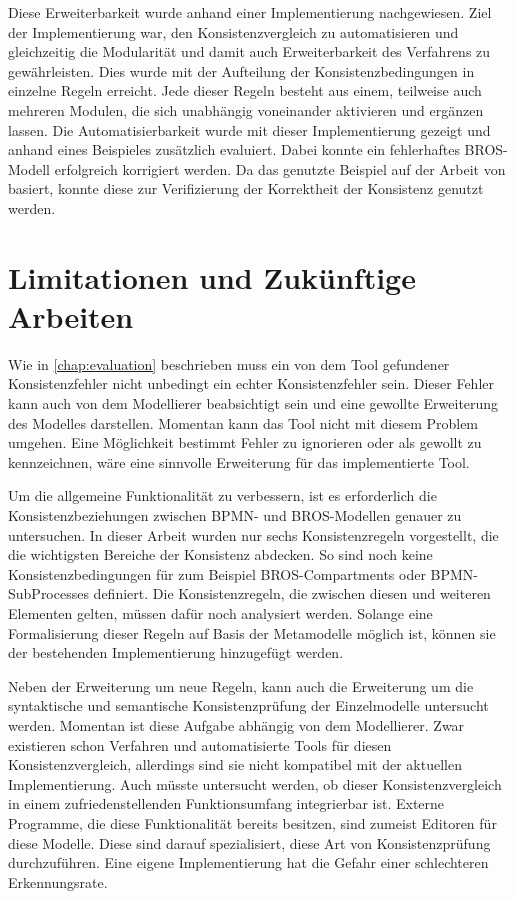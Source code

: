 Diese Erweiterbarkeit wurde anhand einer Implementierung nachgewiesen.
Ziel der Implementierung war, den Konsistenzvergleich zu automatisieren und gleichzeitig die Modularität und damit auch Erweiterbarkeit des Verfahrens zu gewährleisten.
Dies wurde mit der Aufteilung der Konsistenzbedingungen in einzelne Regeln erreicht.
Jede dieser Regeln besteht aus einem, teilweise auch mehreren Modulen, die sich unabhängig voneinander aktivieren und ergänzen lassen.
Die Automatisierbarkeit wurde mit dieser Implementierung gezeigt und anhand eines Beispieles zusätzlich evaluiert.
Dabei konnte ein fehlerhaftes BROS-Modell erfolgreich korrigiert werden.
Da das genutzte Beispiel auf der Arbeit von \cite{Schoen} basiert, konnte diese zur Verifizierung der Korrektheit der Konsistenz genutzt werden.

\section{Limitationen und Zukünftige Arbeiten}

Wie in \cref{chap:evaluation} beschrieben muss ein von dem Tool gefundener Konsistenzfehler nicht unbedingt ein echter Konsistenzfehler sein.
Dieser Fehler kann auch von dem Modellierer beabsichtigt sein und eine gewollte Erweiterung des Modelles darstellen.
Momentan kann das Tool nicht mit diesem Problem umgehen.
Eine Möglichkeit bestimmt Fehler zu ignorieren oder als gewollt zu kennzeichnen, wäre eine sinnvolle Erweiterung für das implementierte Tool.

Um die allgemeine Funktionalität zu verbessern, ist es erforderlich die Konsistenzbeziehungen zwischen BPMN- und BROS-Modellen genauer zu untersuchen.
In dieser Arbeit wurden nur sechs Konsistenzregeln vorgestellt, die die wichtigsten Bereiche der Konsistenz abdecken.
So sind noch keine Konsistenzbedingungen für zum Beispiel BROS-Compartments oder BPMN-SubProcesses definiert.
Die Konsistenzregeln, die zwischen diesen und weiteren Elementen gelten, müssen dafür noch analysiert werden.
Solange eine Formalisierung dieser Regeln auf Basis der Metamodelle möglich ist, können sie der bestehenden Implementierung hinzugefügt werden.

Neben der Erweiterung um neue Regeln, kann auch die Erweiterung um die syntaktische und semantische Konsistenzprüfung der Einzelmodelle untersucht werden.
Momentan ist diese Aufgabe abhängig von dem Modellierer.
Zwar existieren schon Verfahren und automatisierte Tools für diesen Konsistenzvergleich, allerdings sind sie nicht kompatibel mit der aktuellen Implementierung.
Auch müsste untersucht werden, ob dieser Konsistenzvergleich in einem zufriedenstellenden Funktionsumfang integrierbar ist.
Externe Programme, die diese Funktionalität bereits besitzen, sind zumeist Editoren für diese Modelle.
Diese sind darauf spezialisiert, diese Art von Konsistenzprüfung durchzuführen.
Eine eigene Implementierung hat die Gefahr einer schlechteren Erkennungsrate.

